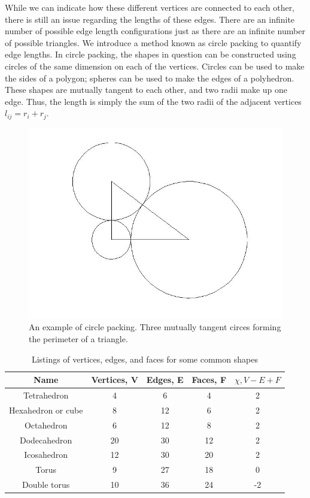 \documentclass[12pt]{article}
\begin{document}
\noindent While we can indicate how these different vertices are connected to each other, there is still an issue regarding the lengths of these edges. There are an infinite number of possible edge length configurations just as there are an infinite number of possible triangles. We introduce a method known as circle packing to quantify edge lengths. In circle packing, the shapes in question can be constructed using circles of the same dimension on each of the vertices. Circles can be used to make the sides of a polygon; spheres can be used to make the edges of a polyhedron. These shapes are mutually tangent to each other, and two radii make up one edge. Thus, the length is simply the sum of the two radii of the adjacent vertices $l_{ij} = r_i + r_j$.
  
\begin{figure}
\begin{center}
\includegraphics[scale = 0.3]{righttriangulation.jpg}
\end{center}
\caption{An example of circle packing. Three mutually tangent circes forming the perimeter of a triangle.}
\end{figure}

\begin{table}
\begin{tabular}{ccccc}
Name  &	Vertices, V &	Edges, E & Faces, F &	$\chi, V - E + F$\\
\hline 
Tetrahedron &	4 &	6 &	4 &	2\\
Hexahedron or cube &	8 &	12 &	6 &	2\\
Octahedron 	&	6 &	12 &	8 & 2\\
Dodecahedron 	&	20 &	30 &	12 &	2\\
Icosahedron &	12 & 30 & 20 &	2\\
Torus & 9 & 27 & 18 & 0\\
Double torus & 10 & 36 & 24 & -2
\end{tabular}
\caption{Listings of vertices, edges, and faces for some common shapes \cite{wiki}}
\label{EuChar}
\end{table}
\end{document}
